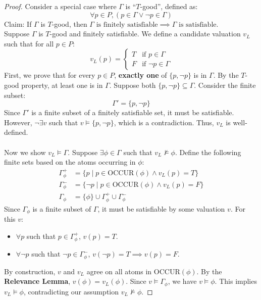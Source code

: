 \documentclass{article}
\begin{document}
\begin{proof}
    Consider a special case where $\Gamma$ is ``$T$-good'', defined as:
    \[ \forall p \in P, (p \in \Gamma \lor \neg p \in \Gamma) \]
    Claim: If $\Gamma$ is $T$-good, then $\Gamma \text{ is finitely satisfiable} \implies \Gamma \text{ is satisfiable}$.\\
    Suppose $\Gamma$ is $T$-good and finitely satisfiable. We define a candidate valuation $v_L$ such that for all $p \in P$:
    \[
    v_L(p) = 
    \begin{cases} 
    T & \text{if } p \in \Gamma \\ 
    F & \text{if } \neg p \in \Gamma 
    \end{cases}
    \]
    First, we prove that for every $p \in P$, \textbf{exactly one} of $\{p, \neg p\}$ is in $\Gamma$. 
    By the $T$-good property, at least one is in $\Gamma$. Suppose both $\{p, \neg p\} \subseteq \Gamma$. Consider the finite subset:
    \[ \Gamma' = \{p, \neg p\} \]
    Since $\Gamma'$ is a finite subset of a finitely satisfiable set, it must be satisfiable. However, $\neg \exists v$ such that $v \models \{p, \neg p\}$, which is a contradiction. Thus, $v_L$ is well-defined.\\\\
    Now we show $v_L \models \Gamma$. Suppose $\exists \phi \in \Gamma$ such that $v_L \not\models \phi$. Define the following finite sets based on the atoms occurring in $\phi$:
    \begin{align*}
        \Gamma_\phi^+ &= \{p \mid p \in \text{OCCUR}(\phi) \land v_L(p) = T\} \\
        \Gamma_\phi^- &= \{\neg p \mid p \in \text{OCCUR}(\phi) \land v_L(p) = F\} \\
        \Gamma_\phi &= \{\phi\} \cup \Gamma_\phi^+ \cup \Gamma_\phi^-
    \end{align*}
    Since $\Gamma_\phi$ is a finite subset of $\Gamma$, it must be satisfiable by some valuation $v$. For this $v$:
    \begin{itemize}
        \item $\forall p$ such that $p \in \Gamma_\phi^+$, $v(p) = T$.
        \item $\forall \neg p$ such that $\neg p \in \Gamma_\phi^-$, $v(\neg p) = T \implies v(p) = F$.
    \end{itemize}
    By construction, $v$ and $v_L$ agree on all atoms in $\text{OCCUR}(\phi)$. By the \textbf{Relevance Lemma}, $v(\phi) = v_L(\phi)$. 
    Since $v \models \Gamma_\phi$, we have $v \models \phi$. This implies $v_L \models \phi$, contradicting our assumption $v_L \not\models \phi$.

\end{proof}
\end{document}
